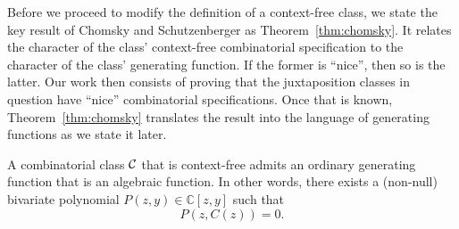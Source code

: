 \documentclass[12pt, a4paper, twoside]{report}
\begin{document}
Before we proceed to modify the definition of a context-free class, we state the key result of Chomsky and Schutzenberger as Theorem~\ref{thm:chomsky}. It relates the character of the class' context-free combinatorial specification to the character of the class' generating function. If the former is ``nice'', then so is the latter. Our work then consists of proving that the juxtaposition classes in question have ``nice'' combinatorial specifications. Once that is known, Theorem~\ref{thm:chomsky} translates the result into the language of generating functions as we state it later.

\begin{theorem}
\label{thm:chomsky}
A combinatorial class $\mathcal{C}$ that is context-free admits an ordinary generating function that is an algebraic function. In other words, there exists a (non-null) bivariate polynomial $P(z,y) \in \mathbb{C}[z,y]$ such that $$P(z,C(z)) = 0.$$
\end{theorem}
\end{document}
